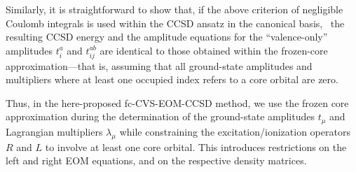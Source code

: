 \documentclass[journal=jctcce,manuscript=article]{achemso}
\begin{document}
Similarly, 
it is straightforward to show that, if the above criterion of negligible Coulomb integrals is used within the CCSD ansatz in the canonical basis,~\cite{Purvis_and_Bartlett} 
the resulting CCSD energy and the amplitude equations for the ``valence-only'' 
amplitudes $t^a_{i}$ and $t^{ab}_{ij}$
are identical to those obtained within the frozen-core 
approximation---that is,
assuming that all ground-state amplitudes and multipliers 
where at least one occupied index refers to a core orbital 
are zero.

Thus, in the here-proposed fc-CVS-EOM-CCSD method, we use the frozen core approximation during the determination of the ground-state amplitudes $t_\mu$ and Lagrangian multipliers ${\lambda}_{\mu}$ while constraining the excitation/ionization operators $R$ and $L$ to involve at least one core orbital. 
This introduces restrictions on the left and right EOM equations, and on the respective density matrices.
\end{document}
